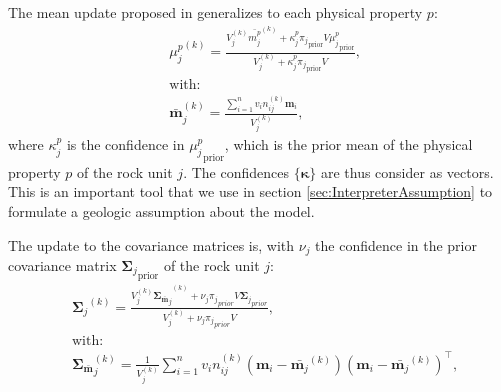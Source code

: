 
The mean update proposed in \citet{ggz389} generalizes to each physical property $p$:
\begin{align}
&{\mu_j^p}^{(k)}=\frac{V_{j}^{(k)}{\bar{{m}^p_j}}^{(k)} + \kappa^p_j {\pi_j}_{\text{prior}} V {\mu^p_j}_{\text{prior}}}{V_{j}^{(k)}+\kappa_j^p {\pi_j}_{\text{prior}} V} \label{eq:mu_update},\\
&\text{with:} \nonumber\\
&{\bar{\mathbf{m}}}_j^{(k)} = \frac{\sum^n_{i=1} v_i n_{ij}^{(k)} \mathbf{m}_i}{V_{j}^{(k)}},
\end{align}
where $\kappa_j^p$ is the confidence in ${{\mu^p_j}_{\text{prior}}}$, which is the prior mean of the physical property $p$ of the rock unit $j$. The confidences $\{\mathbf{\kappa}\}$ are thus consider as vectors. This is an important tool that we use in section \ref{sec:InterpreterAssumption} to formulate a geologic assumption about the model.

The update to the covariance matrices is, with $\nu_j$ the confidence in the prior covariance matrix ${\mathbf{\Sigma}_j}_{\text{prior}}$ of the rock unit $j$:
\begin{align}
&{\mathbf{\Sigma}_j}^{(k)} = \frac{{{V_{j}^{(k)}} {\mathbf{\Sigma}_{\bar{\mathbf{m}}}}_j}^{(k)} + \nu_j {\pi_j}_{prior} V {\mathbf{\Sigma}_j}_{prior}}
{{V_{j}^{(k)}} + \nu_j {\pi_j}_{prior} V} \label{eq:sig_update},\\
&\text{with:} \nonumber\\
&{\mathbf{\Sigma}_{\bar{\mathbf{m}}}}_j^{(k)} =\frac{1}{{V_{j}^{(k)}}} \sum_{i=1}^{n} v_i n_{ij}^{(k)}(\mathbf{m}_i-\bar{\mathbf{m}_j}^{(k)})(\mathbf{m}_i-\bar{\mathbf{m}_j}^{(k)})^\top,
\end{align}

